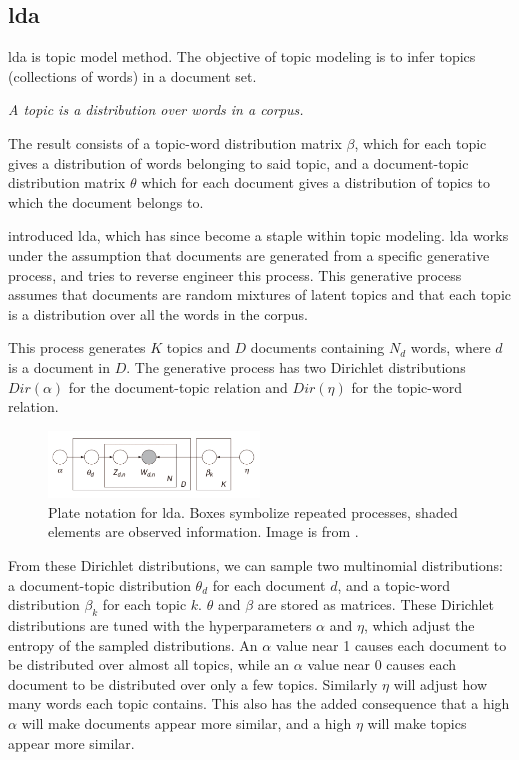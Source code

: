 \subsection{\acrlong{lda}}\label{sec:lda}
\Gls{lda} is topic model method.
The objective of topic modeling is to infer topics (collections of words) in a document set.

\begin{definition}\label{def:topic}
	\textit{A topic is a distribution over words in a corpus.}
\end{definition}

The result consists of a topic-word distribution matrix $\beta$, which for each topic gives a distribution of words belonging to said topic, and a document-topic distribution matrix $\theta$ which for each document gives a distribution of topics to which the document belongs to.

\citet{lda} introduced \gls{lda}, which has since become a staple within topic modeling.
\gls{lda} works under the assumption that documents are generated from a specific generative process, and tries to reverse engineer this process.
This generative process assumes that documents are random mixtures of latent topics and that each topic is a distribution over all the words in the corpus.

This process generates $K$ topics and $D$ documents containing $N_{d}$ words, where $d$ is a document in $D$.
The generative process has two Dirichlet distributions $Dir(\alpha)$ for the document-topic relation and $Dir(\eta)$ for the topic-word relation.

\begin{figure}[h]
	\centering
	\includegraphics[width=0.5\textwidth]{figures/Smoothed_LDA.jpg}
	\caption{Plate notation for \gls{lda}. Boxes symbolize repeated processes, shaded elements are observed information. Image is from \citet{blei2012topicmodels}.}
	\label{fig:lda}
\end{figure}

From these Dirichlet distributions, we can sample two multinomial distributions: a document-topic distribution $\theta_d$ for each document $d$, and a topic-word distribution $\beta_k$ for each topic $k$.
$\theta$ and $\beta$ are stored as matrices.
These Dirichlet distributions are tuned with the hyperparameters $\alpha$ and $\eta$, which adjust the entropy of the sampled distributions.
An $\alpha$ value near 1 causes each document to be distributed over almost all topics, while an $\alpha$ value near 0 causes each document to be distributed over only a few topics.
Similarly $\eta$ will adjust how many words each topic contains.
This also has the added consequence that a high $\alpha$ will make documents appear more similar, and a high $\eta$ will make topics appear more similar.

